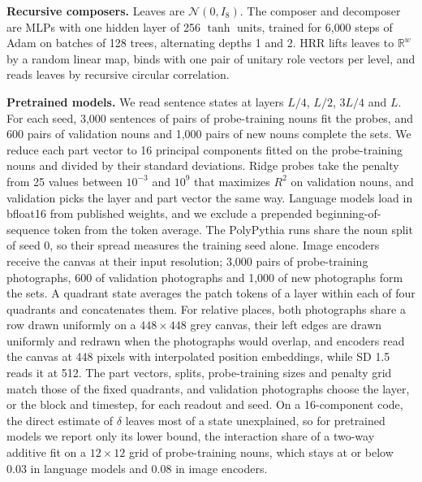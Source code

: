 \documentclass[10pt]{article}
\theoremstyle{plain}
\theoremstyle{remark}
\newcommand{\R}{\mathbb{R}}
\begin{document}
\textbf{Recursive composers.} Leaves are $\mathcal{N}(0, I_8)$. The composer and decomposer are MLPs with one hidden layer of 256 $\tanh$ units, trained for 6{,}000 steps of Adam on batches of 128 trees, alternating depths 1 and 2. HRR lifts leaves to $\R^w$ by a random linear map, binds with one pair of unitary role vectors per level, and reads leaves by recursive circular correlation.

\textbf{Pretrained models.} We read sentence states at layers $L/4$, $L/2$, $3L/4$ and $L$. For each seed, 3{,}000 sentences of pairs of probe-training nouns fit the probes, and 600 pairs of validation nouns and 1{,}000 pairs of new nouns complete the sets. We reduce each part vector to 16 principal components fitted on the probe-training nouns and divided by their standard deviations. Ridge probes take the penalty from 25 values between $10^{-3}$ and $10^{9}$ that maximizes $R^2$ on validation nouns, and validation picks the layer and part vector the same way. Language models load in bfloat16 from published weights, and we exclude a prepended beginning-of-sequence token from the token average. The PolyPythia runs share the noun split of seed 0, so their spread measures the training seed alone. Image encoders receive the canvas at their input resolution; 3{,}000 pairs of probe-training photographs, 600 of validation photographs and 1{,}000 of new photographs form the sets. A quadrant state averages the patch tokens of a layer within each of four quadrants and concatenates them. For relative places, both photographs share a row drawn uniformly on a $448 \times 448$ grey canvas, their left edges are drawn uniformly and redrawn when the photographs would overlap, and encoders read the canvas at 448 pixels with interpolated position embeddings, while SD 1.5 reads it at 512. The part vectors, splits, probe-training sizes and penalty grid match those of the fixed quadrants, and validation photographs choose the layer, or the block and timestep, for each readout and seed. On a 16-component code, the direct estimate of $\delta$ leaves most of a state unexplained, so for pretrained models we report only its lower bound, the interaction share of a two-way additive fit on a $12 \times 12$ grid of probe-training nouns, which stays at or below 0.03 in language models and 0.08 in image encoders.
\end{document}
